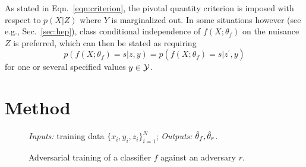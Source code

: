 \documentclass{article}
\theoremstyle{plain}
\begin{document}
As stated in Eqn.~\ref{eqn:criterion}, the pivotal quantity criterion is
imposed with respect to $p(X|Z)$ where $Y$ is marginalized out. In some situations
however (see e.g., Sec.~\ref{sec:hep}), class conditional independence of $f(X;
\theta_f)$ on the nuisance $Z$ is preferred, which can then be stated as
requiring
\begin{equation}\label{eqn:criterion-class}
    p(f(X ; \theta_f) = s | z, y ) = p(f(X ; \theta_f) = s | z^\prime, y )
\end{equation}
for one or several specified values $y \in {\cal Y}$.



\section{Method}
\label{sec:method}

\begin{figure}
    \begin{minipage}{\linewidth}
    \begin{algorithm}[H]
    \caption{Adversarial training of a classifier $f$ against an adversary $r$.}

    {\footnotesize
    \begin{flushleft}
        {\it Inputs:} training data $\{ x_i, y_i, z_i \}_{i=1}^N$;
        {\it Outputs:} $\smash{\hat\theta_f}, \smash{\hat\theta_r}$.
    \end{flushleft}

    \label{alg:adversarial-training}
    \begin{algorithmic}[1]
            \ENDFOR
        \ENDFOR
    \end{algorithmic}
    }
    \end{algorithm}
    \end{minipage}
\end{figure}
\end{document}
